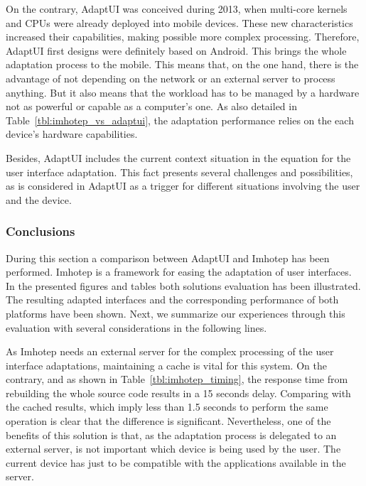 On the contrary, AdaptUI was conceived during 2013, when multi-core kernels and
CPUs were already deployed into mobile devices. These new characteristics 
increased their capabilities, making possible more complex processing. 
Therefore, AdaptUI first designs were definitely based on Android. This brings 
the whole adaptation process to the mobile. This means that, on the one hand, 
there is the advantage of not depending on the network or an external server to 
process anything. But it also means that the workload has to be managed by a 
hardware not as powerful or capable as a computer's one. As also detailed in 
Table~\ref{tbl:imhotep_vs_adaptui}, the adaptation performance relies on the
each device's hardware capabilities. 

Besides, AdaptUI includes the current context situation in the equation for the 
user interface adaptation. This fact presents several challenges and possibilities, 
as is considered in AdaptUI as a trigger for different situations involving the 
user and the device.


\subsubsection{Conclusions}
\label{sec:imhotep_conclusions}

During this section a comparison between AdaptUI and Imhotep has been performed.
Imhotep is a framework for easing the adaptation of user interfaces. In the 
presented figures and tables both solutions evaluation has been illustrated. 
The resulting adapted interfaces and the corresponding performance of both 
platforms have been shown. Next, we summarize our experiences through this 
evaluation with several considerations in the following lines.

As Imhotep needs an external server for the complex processing of the user 
interface adaptations, maintaining a cache is vital for this system. On the 
contrary, and as shown in Table~\ref{tbl:imhotep_timing}, the response time 
from rebuilding the whole source code results in a 15 seconds delay. Comparing with
the cached results, which imply less than 1.5 seconds to perform the same 
operation is clear that the difference is significant. Nevertheless, one of the 
benefits of this solution is that, as the adaptation process is delegated to an 
external server, is not important which device is being used by the user. The
current device has just to be compatible with the applications available in the
server.

